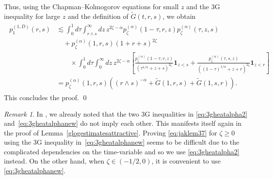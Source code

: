 \documentclass[12pt,reqno]{amsart}
\theoremstyle{definition}
\theoremstyle{remark}
\newtheorem{remark}[theorem]{Remark}
\numberwithin{equation}{section}
\newcommand{\1}{\mathbbm{1}}
\newcommand{\one}{\mathbf{1}}
\begin{document}
Thus, using the Chapman--Kolmogorov equations for small $z$ and the 3G inequality for large $z$ and the definition of $\tilde G(t,r,s)$, we obtain
\begin{align}
  \begin{split}
    p_1^{(1,D)}(r,s)
    & \lesssim \int_0^1 d\tau \int_{r\wedge s}^\infty dz\, z^{2\zeta-\alpha}p_\zeta^{(\alpha)}(1-\tau,r,z)p_\zeta^{(\alpha)}(\tau,z,s) \\
    & \quad + p_\zeta^{(\alpha)}(1,r,s) (1+r+s)^{2\zeta} \\
    & \qquad \times \int_0^1 d\tau \int_0^\infty dz\, z^{2\zeta-\alpha} \left[\frac{p_\zeta^{(\alpha)}(1-\tau,r,z)}{(\tau^{1/\alpha}+z+s)^{2\zeta}}\one_{z<s} + \frac{p_\zeta^{(\alpha)}(\tau,s,z)}{((1-\tau)^{1/\alpha}+z+r)^{2\zeta}}\one_{z<r}\right] \\
    & = p_\zeta^{(\alpha)}(1,r,s)\left((r\wedge s)^{-\alpha} + \tilde G(1,r,s) + \tilde G(1,s,r)\right).
  \end{split}
\end{align}
This concludes the proof. \qed

\begin{remark}
  In \cite{Bogdanetal2024}, we already noted that the two 3G inequalities in \eqref{eq:3gheatalpha2} and~\eqref{eq:3gheatalphanew} do not imply each other. This manifests itself again in the proof of Lemma~\ref{glogestimatesattractive}.
  Proving \eqref{eq:jaklem37} for $\zeta\geq0$ using the 3G inequality in~\eqref{eq:3gheatalphanew} seems to be difficult due to the complicated dependencies on the time-variable and so we use \eqref{eq:3gheatalpha2} instead. On the other hand, when $\zeta\in(-1/2,0)$, it is convenient to use \eqref{eq:3gheatalphanew}.
\end{remark}

\printindex

% 
% 
\end{document}
